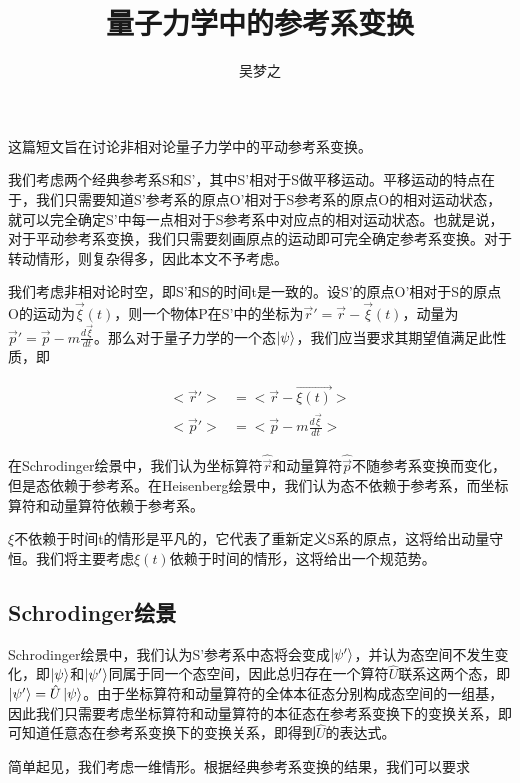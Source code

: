 \documentclass[a4paper]{article}
\title{量子力学中的参考系变换}
\author{吴梦之}
\begin{document}
    \maketitle

    这篇短文旨在讨论非相对论量子力学中的平动参考系变换。

    我们考虑两个经典参考系S和S'，其中S'相对于S做平移运动。平移运动的特点在于，我们只需要知道S'参考系的原点O'相对于S参考系的原点O的相对运动状态，就可以完全确定S'中每一点相对于S参考系中对应点的相对运动状态。也就是说，对于平动参考系变换，我们只需要刻画原点的运动即可完全确定参考系变换。对于转动情形，则复杂得多，因此本文不予考虑。

    我们考虑非相对论时空，即S'和S的时间t是一致的。设S'的原点O'相对于S的原点O的运动为$\vec{\xi}(t)$，则一个物体P在S'中的坐标为$\vec{r}'=\vec{r}-\vec{\xi}(t)$，动量为$\vec{p}'=\vec{p}-m\frac{d\vec{\xi}}{dt}$。那么对于量子力学的一个态$\ket{\psi}$，我们应当要求其期望值满足此性质，即

    \begin{equation}
        \begin{split}
            <\vec{r}'>&=<\vec{r}-\vec{\xi(t)}>      \\
            <\vec{p}'>&=<\vec{p}-m\frac{d\vec{\xi}}{dt}>
        \end{split}
    \end{equation}

    在Schrodinger绘景中，我们认为坐标算符$\hat{\vec{r}}$和动量算符$\hat{\vec{p}}$不随参考系变换而变化，但是态依赖于参考系。在Heisenberg绘景中，我们认为态不依赖于参考系，而坐标算符和动量算符依赖于参考系。

    $\xi$不依赖于时间t的情形是平凡的，它代表了重新定义S系的原点，这将给出动量守恒。我们将主要考虑$\xi(t)$依赖于时间的情形，这将给出一个规范势。

\subsection{Schrodinger绘景}
    Schrodinger绘景中，我们认为S'参考系中态将会变成$\ket{\psi'}$，并认为态空间不发生变化，即$\ket{\psi}$和$\ket{\psi'}$同属于同一个态空间，因此总归存在一个算符$\hat{U}$联系这两个态，即$\ket{\psi'}=\hat{U}\ket{\psi}$。由于坐标算符和动量算符的全体本征态分别构成态空间的一组基，因此我们只需要考虑坐标算符和动量算符的本征态在参考系变换下的变换关系，即可知道任意态在参考系变换下的变换关系，即得到$\hat{U}$的表达式。

    简单起见，我们考虑一维情形。根据经典参考系变换的结果，我们可以要求
\end{document}
